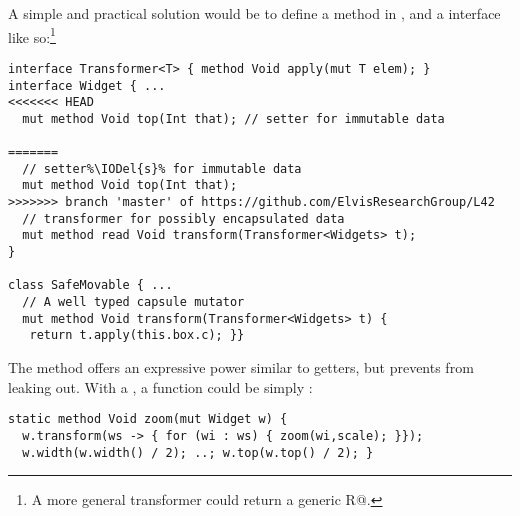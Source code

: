 A simple and practical solution would be to define a \Q@transform@ method in \Q@Widget@, and a \Q@Transformer@ interface 
like so:\footnote{A more general transformer could return a generic \Q@read R@.}
\begin{lstlisting}[escapechar=\%]
interface Transformer<T> { method Void apply(mut T elem); }
interface Widget { ...
<<<<<<< HEAD
  mut method Void top(Int that); // setter for immutable data
  
=======
  // setter%\IODel{s}% for immutable data
  mut method Void top(Int that);
>>>>>>> branch 'master' of https://github.com/ElvisResearchGroup/L42
  // transformer for possibly encapsulated data
  mut method read Void transform(Transformer<Widgets> t);
}

class SafeMovable { ...
  // A well typed capsule mutator
  mut method Void transform(Transformer<Widgets> t) {
   return t.apply(this.box.c); }}
\end{lstlisting}\saveSpace
The \Q@transform@ method offers an expressive power similar to \Q@mut@ getters, but prevents \Q@Widgets@ from leaking out.  With a \Q@Transformer@, a \Q@zoom@ function could be simply :
\begin{lstlisting}
static method Void zoom(mut Widget w) {
  w.transform(ws -> { for (wi : ws) { zoom(wi,scale); }});
  w.width(w.width() / 2); ..; w.top(w.top() / 2); }
\end{lstlisting}




